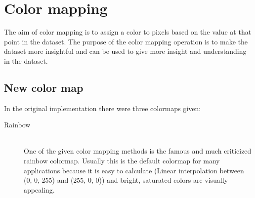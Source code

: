 \section{Color mapping}
	\label{sec:color_mapping}
	The aim of color mapping is to assign a color to pixels based on the value at that point in the dataset. 
	The purpose of the color mapping operation is to make the dataset more insightful and can be used to give more insight and understanding in the dataset.
	\subsection{New color map}
		In the original implementation there were three colormaps given:
		\begin{description}
			\item[Rainbow] ~\\
			One of the given color mapping methods is the famous and much criticized\cite{RainbowMisleading}\cite{moreland2009diverging} rainbow colormap. 
			Usually this is the default colormap for many applications because it is easy to calculate (Linear interpolation between (0, 0, 255) and (255, 0, 0)) and bright, saturated colors are visually appealing.
			\begin{figure}[htb]
			  \centering

\end{figure}
\end{description}
